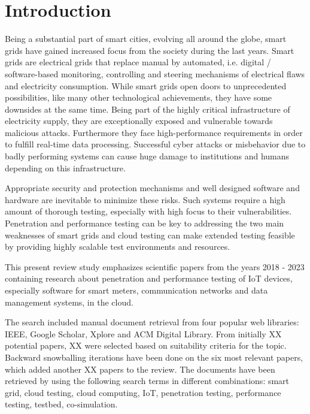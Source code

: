 \section{Introduction}
Being a substantial part of smart cities, evolving all around the globe, smart grids have gained increased focus from the society during the last years. Smart grids are electrical grids that replace manual by automated, i.e. digital / software-based monitoring, controlling and steering mechanisms of electrical flaws and electricity consumption. While smart grids open doors to unprecedented possibilities, like many other technological achievements, they have some downsides at the same time. Being part of the highly critical infrastructure of electricity supply, they are exceptionally exposed and vulnerable towards malicious attacks. Furthermore they face high-performance requirements in order to fulfill real-time data processing. Successful cyber attacks or misbehavior due to badly performing systems can cause huge damage to institutions and humans depending on this infrastructure.

Appropriate security and protection mechanisms and well designed software and hardware are inevitable to minimize these risks. Such systems require a high amount of thorough testing, especially with high focus to their vulnerabilities. Penetration and performance testing can be key to addressing the two main weaknesses of smart grids and cloud testing can make extended testing feasible by providing highly scalable test environments and resources.

This present review study emphasizes scientific papers from the years 2018 - 2023 containing research about penetration and performance testing of IoT devices, especially software for smart meters, communication networks and data management systems, in the cloud.

The search included manual document retrieval from four popular web libraries: IEEE, Google Scholar, Xplore and ACM Digital Library. From initially XX potential papers, XX were selected based on suitability criteria for the topic. Backward snowballing iterations have been done on the six most relevant papers, which added another XX papers to the review. The documents have been retrieved by using the following search terms in different combinations: smart grid, cloud testing, cloud computing, IoT, penetration testing, performance testing, testbed, co-simulation.
